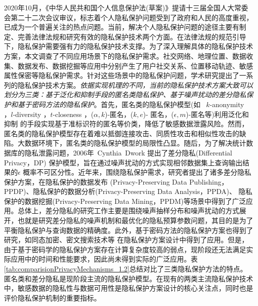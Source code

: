 2020年10月，《中华人民共和国个人信息保护法(草案)》提请十三届全国人大常委会第二十二次会议审议，标志着个人隐私保护问题受到了政府和人民的高度重视，已成为一个普遍关注的热点问题。当前，解决个人隐私保护问题的途径主要有制定、完善法律法规和研究有效的隐私保护技术两个方面。在法律法规的规范引导下，隐私保护需要强有力的隐私保护技术支撑。为了深入理解具体的隐私保护技术方案，本文调查了不同应用场景下的隐私保护需求。社交网络\cite{wei2020asgldp,kasiviswanathan2013analyzing,jorgensen2016publishing}、地理位置\cite{oya2017back,zhang2019online,andres2013geo}、数据收集\cite{wang2016using,wang2019collecting,wang2017locally,wang2019local}、数据发布\cite{zhu2017differentially,qardaji2014priview}、数据挖掘\cite{agrawal2001on,agrawal2005privacy,wang2018locally}等应用中分别产生了用户社交关系、位置移动轨迹、敏感属性保密等隐私保护需求。针对这些场景中的隐私保护问题，学术研究提出了一系列的隐私保护技术方案。{\em 依据实现机理的不同，当前的隐私保护技术方案大致可以划分为三类：基于泛化和抑制手段的匿名类隐私保护、基于噪声扰动的差分隐私保护和基于密码方法的隐私保护}。首先，匿名类的隐私保护模型(如 ~$k$-anonymity \cite{sweeney2002k}，$l$-diversity \cite{machanavajjhala2006l}，$t$-closeness \cite{li2007t}，($\alpha,k$)-匿名\cite{wong2006a}，($k,e$)- 匿名\cite{zhang2007aggregate}，($\epsilon,m$)-匿名\cite{li2008preservation}等)利用泛化和抑制
\cite{sweeney2002achieving}的手段实现基于准标识符的匿名等价类，降低了敏感数据泄露风险。然而，匿名类的隐私保护模型存在着难以抵御连接攻击、同质性攻击和相似性攻击的缺陷。大数据环境下，匿名类的隐私保护模型的局限性凸显。随后，为了解决统计数据库的隐私泄露问题，2006年~Cynthia~Dwork 提出了差分隐私(Differential Privacy，DP)\cite{dwork2006differential} 保护模型，旨在通过噪声扰动\cite{dwork2006calibrating}的方式实现相邻数据集上查询输出结果的$\epsilon$ 概率不可区分性。近年来，围绕隐私保护需求，研究者提出了诸多差分隐私保护方案，在隐私保护的数据发布 (Privacy-Preserving Data Publishing，PPDP)、隐私保护的数据分析(Privacy-Preserving Data Analysis，PPDA)、 隐私保护的数据挖掘(Privacy-Preserving Data Mining，PPDM)等场景中得到了广泛应用\cite{zhu2017differential}。总体上，差分隐私的研究工作主要是围绕噪声抽样分布和噪声扰动的方式展开，也就是研究差分隐私的噪声机制和最优化的隐私预算参数问题，其目的是为了平衡隐私保护与查询数据的精确度。此外，基于密码方法的隐私保护方案也得到了研究，如同态加密、密文搜索技术等 \cite{Lifenghua16}在隐私保护方案设计中得到了应用。但是，由于基于密码学的隐私保护方案存在计算复杂度较高的弱点，现阶段还无法满足实际应用中的时间和性能要求，因此尚未得到实际的广泛应用。表\ref{tab:comparisionPrivacyMechanisms_1.2}总结对比了三类隐私保护方法的特点。匿名类和差分隐私是现阶段主流的隐私保护模型。在现有的两类主流隐私保护技术中，敏感数据的隐私性与数据可用性是隐私保护方案设计的核心关注点，同时也是评价隐私保护机制的重要指标。

